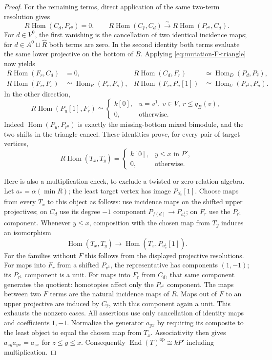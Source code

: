 \documentclass[11pt]{article}
\theoremstyle{definition}
\newcommand{\Hom}{\operatorname{Hom}}
\newcommand{\End}{\operatorname{End}}
\begin{document}
\begin{proof}
For the remaining terms, direct application of the same two-term
resolution gives
\[
 R\Hom(C_d,P_{r^0})=0,\qquad
 R\Hom(C_{\widehat r},C_d)\xrightarrow{\sim}
                                  R\Hom(P_{r^0},C_d).
\]
For $d\in V^0$, the first vanishing is the cancellation of two
identical incidence maps; for $d\in A^0\sqcup\widehat R$ both
terms are zero. In the second identity both terms evaluate the
same lower projective on the bottom of $B$. Applying
\eqref{eq:mutation-F-triangle} now yields
\begin{align*}
 R\Hom(F_r,C_d)&=0,&
 R\Hom(C_d,F_r)&\simeq\Hom_D(P_d,P_{\widehat r}),\\
 R\Hom(F_r,F_s)&\simeq\Hom_R(P_r,P_s),&
 R\Hom(F_r,P_u[1])&\simeq\Hom_U(P_{r^1},P_u).
\end{align*}
In the other direction,
\[
 R\Hom(P_u[1],F_r)\simeq
 \begin{cases}
  k[0],&u=v^1,\ v\in V,\ r\leq q_B(v),\\
  0,&\text{otherwise}.
 \end{cases}
\]
Indeed $\Hom(P_u,P_{r^0})$ is exactly the missing-bottom mixed
bimodule, and the two shifts in the triangle cancel.
These identities prove, for every pair of target vertices,
\[
 R\Hom(T_x,T_y)=
 \begin{cases} k[0],&y\leq x\text{ in }P',\\0,&\text{otherwise}.
 \end{cases}
\]

Here is also a multiplication check, to exclude a twisted or
zero-relation algebra. Let $a_*=\alpha(\min R)$; the least target
vertex has image $P_{a_*^1}[1]$. Choose maps from every $T_x$ to
this object as follows: use incidence maps on the shifted upper
projectives; on $C_d$ use its degree $-1$ component
$P_{f(d)}\to P_{a_*^1}$; on $F_r$ use the $P_{r^1}$ component.
Whenever $y\leq x$, composition with the chosen map from $T_y$
induces an isomorphism
\[
 \Hom(T_x,T_y)\longrightarrow\Hom(T_x,P_{a_*^1}[1]).
\]
For the families without $F$ this follows from the displayed
projective resolutions. For maps into $F_r$ from a shifted
$P_{v^1}$, the representative has components $(1,-1)$; its
$P_{r^1}$ component is a unit. For maps into $F_r$ from $C_d$,
that same component generates the quotient: homotopies affect
only the $P_{r^0}$ component. The maps between two $F$ terms are
the natural incidence maps of $R$. Maps out of $F$ to an upper
projective are induced by $C_{\widehat r}$, with this component
again a unit. This exhausts the nonzero cases. All assertions use
only cancellation of identity maps and coefficients $1,-1$.
Normalize the generator $a_{yx}$ by requiring its composite to
the least object to equal the chosen map from $T_x$. Associativity
then gives $a_{zy}a_{yx}=a_{zx}$ for $z\leq y\leq x$. Consequently
$\End(T)^{\mathrm{op}}\cong kP'$ including multiplication.


\end{proof}
\end{document}
